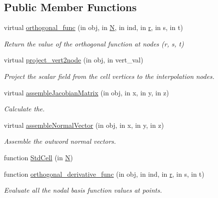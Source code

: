 \subsection*{Public Member Functions}
\begin{DoxyCompactItemize}
\item 
virtual \hyperlink{class_std_cell_a3bf9f78e246c520bb4e8d2f7847774e7}{orthogonal\+\_\+func} (in obj, in \hyperlink{class_std_cell_a8df35ad5169af36d3dff62644f7878c9}{N}, in ind, in \hyperlink{class_std_cell_a737dd2feb25f74be0215a594334ec622}{r}, in s, in t)
\begin{DoxyCompactList}\small\item\em Return the value of the orthogonal function at nodes (r, s, t) \end{DoxyCompactList}\item 
virtual \hyperlink{class_std_cell_a2d257d7d23bc6a820371b29a758e8814}{project\+\_\+vert2node} (in obj, in vert\+\_\+val)
\begin{DoxyCompactList}\small\item\em Project the scalar field from the cell vertices to the interpolation nodes. \end{DoxyCompactList}\item 
virtual \hyperlink{class_std_cell_adbcc2243662eeb5804e05553fc0a5471}{assemble\+Jacobian\+Matrix} (in obj, in x, in y, in z)
\begin{DoxyCompactList}\small\item\em Calculate the. \end{DoxyCompactList}\item 
virtual \hyperlink{class_std_cell_aa0aaf9cf17637840f9d19571a9f7c47f}{assemble\+Normal\+Vector} (in obj, in x, in y, in z)
\begin{DoxyCompactList}\small\item\em Assemble the outword normal vectors. \end{DoxyCompactList}\item 
function \hyperlink{class_std_cell_a077bac0ebed5538704a6fc1de3c70548}{Std\+Cell} (in \hyperlink{class_std_cell_a8df35ad5169af36d3dff62644f7878c9}{N})
\item 
function \hyperlink{class_std_cell_a2c99aaf398a666856e7cfcefd44ffefc}{orthogonal\+\_\+derivative\+\_\+func} (in obj, in ind, in \hyperlink{class_std_cell_a737dd2feb25f74be0215a594334ec622}{r}, in s, in t)
\begin{DoxyCompactList}\small\item\em Evaluate all the nodal basis function values at points. \end{DoxyCompactList}\item 

\end{DoxyCompactItemize}
